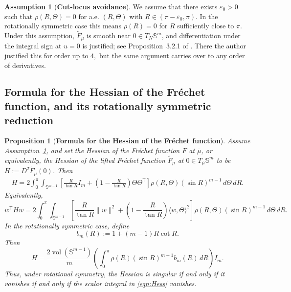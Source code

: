 \documentclass{amsart}
\newtheorem{proposition}[theorem]{Proposition}
\theoremstyle{definition}
\newtheorem{assumption}[theorem]{Assumption}
\theoremstyle{remark}
\newcommand{\mubar}{\bar{\mu}}
\newcommand\0{\boldsymbol{0}}
\begin{document}
\begin{assumption}[\textbf{Cut-locus avoidance}]
\label{assum:density-assumption}
We assume that there exists \(\varepsilon_0>0\) such that \(\rho(R,\Theta)=0\) for a.e. \((R,\Theta)\) with \(R\in(\pi-\varepsilon_0,\pi)\).  In the rotationally symmetric case this means \(\rho(R)=0\) for \(R\) sufficiently close to \(\pi\).  Under this assumption, \(\widetilde F_\mu\) is smooth near \(0\in T_N\mathbb S^m\), and differentiation under the integral sign at \(u=0\) is justified; see Proposition~3.2.1 of \citet{Tran2020Sampling}. There the author justified this for order up to $4,$ but the same argument carries over to any order of derivatives.
\end{assumption}

\subsection{Formula for the Hessian of the Fréchet function, and its rotationally symmetric reduction}
\label{para:Hess-general-density}

\begin{proposition}[\textbf{Formula for the Hessian of the Fréchet function}]
\label{prop:Hessian-common}
Assume Assumption~\ref{assum:density-assumption}, and set the Hessian of the Fréchet function $F$ at $\mubar$, or equivalently, the Hessian of the lifted Fréchet function $\widetilde{F}_\mu$ at $0\in T_{\mubar}\mathbb{S}^m$ to be  \(H:=D^2\widetilde F_\mu(0)\).  Then
\begin{equation}
\label{eqn:Hessian-general-density}
\boxed{
\begin{aligned}
    H
    =
    2\int_0^\pi\!\!\int_{\mathbb S^{m-1}}
    \left[
    \frac{R}{\tan R}I_m+
    \left(1-\frac{R}{\tan R}\right)\Theta\Theta^{\mathsf T}
    \right]
    \rho(R,\Theta)(\sin R)^{m-1}\,d\Theta\,dR .
\end{aligned}}
\end{equation}
Equivalently,
\begin{equation}
\label{eqn:Hessian-general-bilinear-form}
    w^{\mathsf T}Hw
    =
    2\int_0^\pi\!\!\int_{\mathbb S^{m-1}}
    \left[
    \frac{R}{\tan R}\|w\|^2+
    \left(1-\frac{R}{\tan R}\right)\langle w,\Theta\rangle^2
    \right]    \rho(R,\Theta)(\sin R)^{m-1}\,d\Theta\,dR .
\end{equation}
In the rotationally symmetric case, define
\begin{equation}\label{eqn:b}
    b_m(R):=1+(m-1)R\cot R .
\end{equation}
Then
\begin{equation}
\label{eqn:Hess}
\boxed{
    H
    =
    \frac{2\operatorname{vol}(\mathbb S^{m-1})}{m}
    \left(\int_0^\pi \rho(R)(\sin R)^{m-1}b_m(R)\,dR\right)I_m .
}
\end{equation}
Thus, under rotational symmetry, the Hessian is singular\textit{ if and only if} it vanishes \textit{if and only if }the scalar integral in \eqref{eqn:Hess} vanishes.
\end{proposition}
\end{document}
